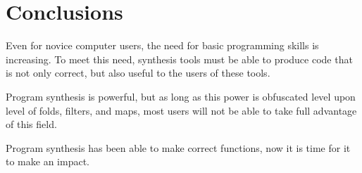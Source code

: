 \section{Conclusions}
\label{conclusions}
Even for novice computer users, the need for basic programming skills is increasing. To meet this need, synthesis tools must be able to produce code that is not only correct, but also useful to the users of these tools.

Program synthesis is powerful, but as long as this power is obfuscated level upon level of folds, filters, and maps, most users will not be able to take full advantage of this field. 

Program synthesis has been able to make correct functions, now it is time for it to make an impact.